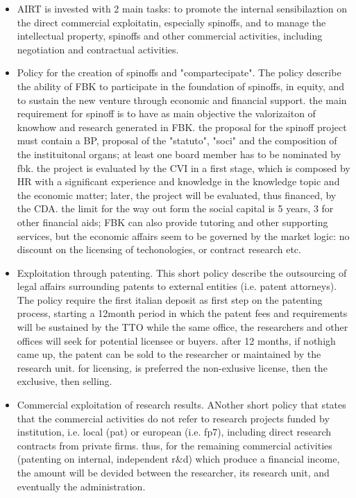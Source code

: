 \begin{itemize}

\item AIRT is invested with 2 main tasks: to promote the internal sensibilaztion on the direct commercial exploitatin, especially spinoffs, and to manage the intellectual property, spinoffs and other commercial activities, including negotiation and contractual activities. 

\item Policy for the creation of spinoffs and "compartecipate". The policy describe the ability of FBK to participate in the foundation of spinoffs, in equity, and to sustain the new venture through economic and financial support. the main requirement for spinoff is to have as main objective the valorizaiton of knowhow and research generated in FBK. the proposal for the spinoff project must contain a BP, proposal of the "statuto", "soci" and the composition of the instituitonal organs; at least one board member has to be nominated by fbk. the project is evaluated by the CVI in a first stage, which is composed by HR with a significant experience and knowledge in the knowledge topic and the economic matter; later, the project will be evaluated, thus financed, by the CDA. the limit for the way out form the social capital is 5 years, 3 for other financial aids; FBK can also provide tutoring and other supporting services, but the economic affairs seem to be governed by the market logic: no discount on the licensing of techonologies, or contract research etc. 

\item Exploitation through patenting. This short policy describe the outsourcing of legal affairs surrounding patents to external entities (i.e. patent attorneys). The policy require the first italian deposit as first step on the patenting process, starting a 12month period in which the patent fees and requirements will be sustained by the TTO while the same office, the researchers and other offices will seek for potential licensee or buyers. after 12 months, if nothigh came up, the patent can be sold to the researcher or maintained by the research unit. for licensing, is preferred the non-exlusive license, then the exclusive, then selling.

\item Commercial exploitation of research results. ANother short policy that states that the commercial activities do not refer to research projects funded by institution, i.e. local (pat) or european (i.e. fp7), including  direct research contracts from private firms. thus, for the remaining commercial activities (patenting on internal, independent r\&d) which produce a financial income, the amount will be devided between the researcher, its research unit, and eventually the administration.

\end{itemize}

